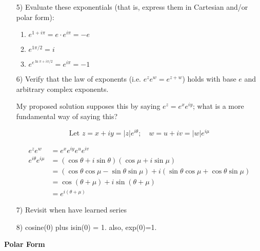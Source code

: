 \documentclass{book}
\begin{document}
\begin{enumerate}
\item[5)] Evaluate these exponentials (that is, express them in Cartesian and/or polar form):
\begin{enumerate}[label=(\alph*)]
\item $e^{1+i\pi}=\boxed{e\cdot e^{i\pi}}=\boxed{-e}$
\item $\boxed{e^{1\pi/2}}=\boxed{i}$
\item $e^{e^{\ln\pi+i\pi/2}}=\boxed{e^{i\pi}}=\boxed{-1}$
\end{enumerate}
\item[6)] Verify that the law of exponents (i.e. $e^ze^w=e^{z+w}$) holds with base $e$ and arbitrary complex exponents.

My proposed solution supposes this by saying $e^z=e^xe^{iy}$; what is a more fundamental way of saying this?

\[\mbox{Let }z=x+iy=|z|e^{i\theta};\quad w=u+iv=|w|e^{i\mu}\]

\begin{align*}
e^ze^w&=e^xe^{iy}e^ue^{iv}\\
e^{i\theta}e^{i\mu}&=(\cos\theta+i\sin\theta)(\cos\mu+i\sin\mu)\\
&=(\cos\theta\cos\mu-\sin\theta\sin\mu)+i(\sin\theta\cos\mu+\cos\theta\sin\mu)\\
&=\cos(\theta+\mu)+i\sin(\theta+\mu)\\
&=e^{i(\theta+\mu)}
\end{align*}

\item[7)] Revisit when have learned series
\item[8)] cosine(0) plus isin(0) = 1. also, exp(0)=1.
\end{enumerate}

\vspace{10pt}

{\bf{}Polar Form}
\end{document}
